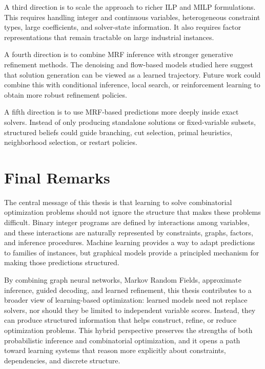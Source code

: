 A third direction is to scale the approach to richer ILP and MILP formulations. This requires handling integer and continuous variables, heterogeneous constraint types, large coefficients, and solver-state information. It also requires factor representations that remain tractable on large industrial instances.

A fourth direction is to combine MRF inference with stronger generative refinement methods. The denoising and flow-based models studied here suggest that solution generation can be viewed as a learned trajectory. Future work could combine this with conditional inference, local search, or reinforcement learning to obtain more robust refinement policies.

A fifth direction is to use MRF-based predictions more deeply inside exact solvers. Instead of only producing standalone solutions or fixed-variable subsets, structured beliefs could guide branching, cut selection, primal heuristics, neighborhood selection, or restart policies.

\section{Final Remarks}

The central message of this thesis is that learning to solve combinatorial optimization problems should not ignore the structure that makes these problems difficult. Binary integer programs are defined by interactions among variables, and these interactions are naturally represented by constraints, graphs, factors, and inference procedures. Machine learning provides a way to adapt predictions to families of instances, but graphical models provide a principled mechanism for making those predictions structured.

By combining graph neural networks, Markov Random Fields, approximate inference, guided decoding, and learned refinement, this thesis contributes to a broader view of learning-based optimization: learned models need not replace solvers, nor should they be limited to independent variable scores. Instead, they can produce structured information that helps construct, refine, or reduce optimization problems. This hybrid perspective preserves the strengths of both probabilistic inference and combinatorial optimization, and it opens a path toward learning systems that reason more explicitly about constraints, dependencies, and discrete structure.